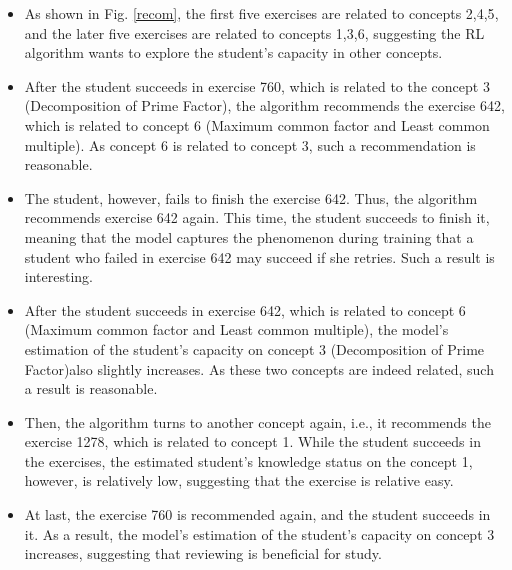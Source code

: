 \documentclass{edm_template}
\begin{document}


\begin{itemize}
	\item As shown in Fig. \ref{recom}, the first five exercises are related to concepts {2,4,5}, and the later five exercises are related to concepts {1,3,6}, suggesting the RL algorithm wants to explore the student's capacity in other concepts.
	\item After the student succeeds in exercise 760, which is related to the concept 3 (Decomposition of Prime Factor), the algorithm recommends the exercise 642, which is related to concept 6 (Maximum common factor and Least common multiple). As concept 6 is related to concept 3, such a recommendation is reasonable.
	\item The student, however, fails to finish the exercise 642. Thus, the algorithm recommends exercise 642 again. This time, the student succeeds to finish it, meaning that the model captures the phenomenon during training that a student who failed in exercise 642 may succeed if she retries. Such a result is interesting.
	\item After the student succeeds in exercise 642, which is related to concept 6 (Maximum common factor and Least common multiple), the model's estimation of the student's capacity on concept 3 (Decomposition of Prime Factor)also slightly increases. As these two concepts are indeed related, such a result is reasonable.
	\item Then, the algorithm turns to another concept again, i.e., it recommends the exercise 1278, which is related to concept 1. While the student succeeds in the exercises, the estimated student's knowledge status on the concept 1, however, is relatively low, suggesting that the exercise is relative easy.
	\item At last, the exercise 760 is recommended again, and the student succeeds in it. As a result, the model's estimation of the student's capacity on concept 3 increases, suggesting that reviewing is beneficial for study.
\end{itemize}


\end{document}

